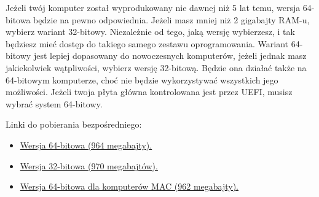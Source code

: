 Jeżeli twój komputer został wyprodukowany nie dawnej niż 5 lat temu, wersja 64-bitowa będzie na pewno odpowiednia. Jeżeli masz mniej niż 2 gigabajty RAM-u, wybierz wariant 32-bitowy. Niezależnie od tego, jaką wersję wybierzesz, i tak będziesz mieć dostęp do takiego samego zestawu oprogramowania. Wariant 64-bitowy jest lepiej dopasowany do nowoczesnych komputerów, jeżeli jednak masz jakiekolwiek wątpliwości, wybierz wersję 32-bitową. Będzie ona działać także na 64-bitowym komputerze, choć nie będzie wykorzystywać wszystkich jego możliwości. Jeżeli twoja płyta główna kontrolowana jest przez UEFI, musisz wybrać system 64-bitowy.

Linki do pobierania bezpośredniego:
\begin{itemize}
\item \href{http://releases.ubuntu.com/14.04/ubuntu-14.04-desktop-amd64.iso}{Wersja 64-bitowa (964 megabajty).}
\item \href{http://releases.ubuntu.com/14.04/ubuntu-14.04-desktop-i386.iso}{Wersja 32-bitowa (970 megabajtów).}
\item \href{http://releases.ubuntu.com/14.04/ubuntu-14.04-desktop-amd64+mac.iso}{Wersja 64-bitowa dla komputerów MAC (962  megabajty).}
\end{itemize}
